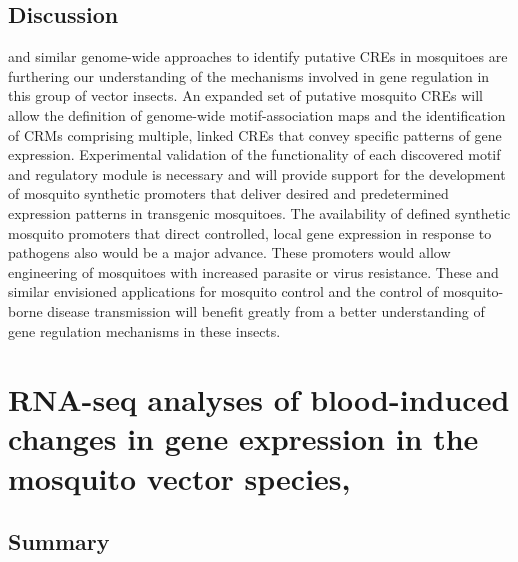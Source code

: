 \subsection{Discussion}
\citet{Sieglaff2009} and similar genome-wide approaches to identify putative \glspl{CRE} in mosquitoes \cite{Hernandez-Romano2008} are furthering our understanding of the mechanisms involved in gene regulation in this group of vector insects. An expanded set of putative mosquito \glspl{CRE} will allow the definition of genome-wide motif-association maps and the identification of \glspl{CRM} comprising multiple, linked \glspl{CRE} that convey specific patterns of gene expression. Experimental validation of the functionality of each discovered motif and regulatory module is necessary and will provide support for the development of mosquito synthetic promoters that deliver desired and predetermined expression patterns in transgenic mosquitoes. 
The availability of defined synthetic mosquito promoters that direct controlled, local gene expression in response to pathogens also would be a major advance. These promoters would allow engineering of mosquitoes with increased parasite or virus resistance. These and similar envisioned applications for mosquito control and the control of mosquito-borne disease transmission will benefit greatly from a better understanding of gene regulation mechanisms in these insects.










\pagebreak

\section{RNA-seq analyses of blood-induced changes in gene expression in the mosquito vector species, \Aea\ \cite{Bonizzoni2011}}

\subsection{Summary}


